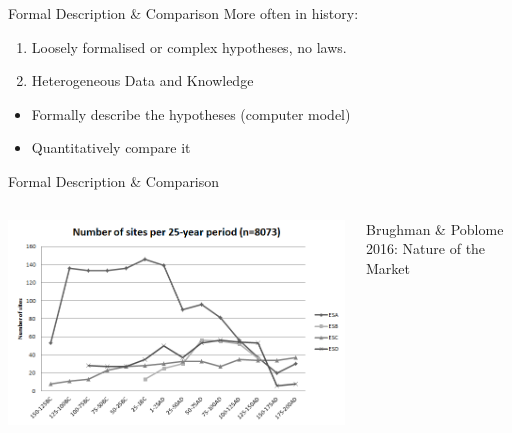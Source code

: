 \documentclass[12pt, notes=show,handout=no]{beamer}
\begin{document}
\begin{frame}{Formal Description \& Comparison}
    More often in history:
	\begin{enumerate}
	    \item<1-> Loosely formalised or complex hypotheses, no laws.
		\vfill
	    \item<2-> Heterogeneous Data and Knowledge
	\end{enumerate}
		\vfill
	 

	\begin{itemize}
	    \item<5-> Formally describe the hypotheses (computer model)
	    \item<6-> Quantitatively compare it
	\end{itemize}
\end{frame}
\begin{frame}{Formal Description \& Comparison}
    \begin{columns}
	\begin{column}{.6\textwidth}
	    \begin{center}
		\includegraphics[width=\textwidth]{images/wareRome.png} 
	    \end{center}
	\end{column}
	\begin{column}{.45\textwidth}
	\small Brughman \& Poblome 2016: Nature of the Market
	\end{column}
    \end{columns}

\end{frame}
\end{document}
